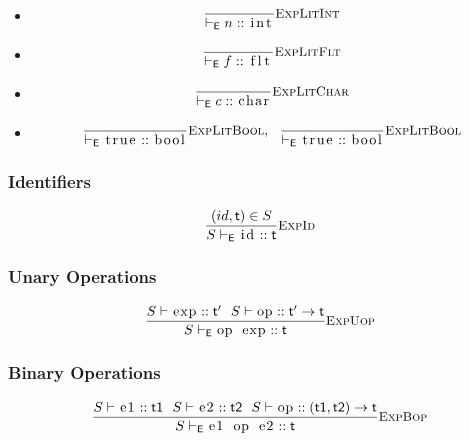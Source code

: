 \documentclass{article}
\newcommand{\code}[1]{\lstinline[columns=fixed]{#1}}
\newcommand{\drmrule}[5]{\frac{#1}{#2\vdash_{\mathsf{#3}}#4}\textsc{\small{#5}}}
\begin{document}
				\begin{itemize}
					\item
						\begin{align*}
							\drmrule{}{}{E}{n :: \textnormal{\code{int}}}{ExpLitInt}
						\end{align*}
					\item
						\begin{align*}
							\drmrule{}{}{E}{f :: \textnormal{\code{flt}}}{ExpLitFlt}
						\end{align*}
					\item
						\begin{align*}
							\drmrule{}{}{E}{c :: \textnormal{\code{char}}}{ExpLitChar}
						\end{align*}
					\item
						\begin{align*}
							\drmrule{}{}{E}{\textnormal{\code{true}} :: \textnormal{\code{bool}}}{ExpLitBool},\ \ 
							\drmrule{}{}{E}{\textnormal{\code{true}} :: \textnormal{\code{bool}}}{ExpLitBool}
						\end{align*}
				\end{itemize}
			
			\subsubsection{Identifiers}
			
				\begin{align*}
					\drmrule{(id,\mathsf{t})\in S}{S}{E}{\textnormal{\code{id}} :: \mathsf{t}}{ExpId}
				\end{align*}
			
			\subsubsection{Unary Operations}
			
				\begin{align*}
					\drmrule{S\vdash\textnormal{\code{exp}} :: \mathsf{t'}\ \ S\vdash\textnormal{\code{op}} :: \mathsf{t' \to t}}{S}{E}{\textnormal{\code{op exp}} :: \mathsf{t}}{ExpUop}
				\end{align*}
			
			\subsubsection{Binary Operations}
			
				\begin{align*}
					\drmrule{S\vdash\textnormal{\code{e1}} :: \mathsf{t1}\ \ S\vdash\textnormal{\code{e2}} :: \mathsf{t2}\ \ S\vdash\textnormal{\code{op}} :: \mathsf{(t1,t2) \to t}}{S}{E}{\textnormal{\code{e1 op e2}} :: \mathsf{t}}{ExpBop}
				\end{align*}
			
\end{document}
